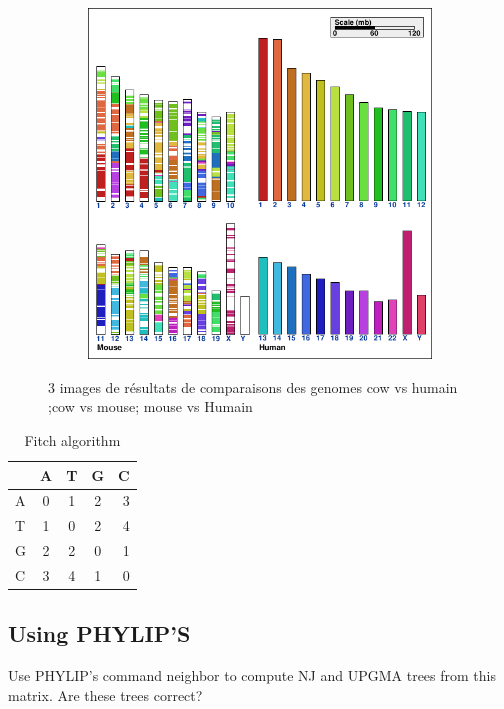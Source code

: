\begin{figure}[!h]
\begin{subfigure}[b]{0.13\textwidth}
\includegraphics[width=\textwidth]{imag/graph3_mouse_Himan1}
\end{subfigure}
\caption{3 images de r\'{e}sultats de comparaisons des genomes cow vs humain ;cow vs mouse; mouse vs Humain}
\end{figure}

\begin{table}[!h]
  \centering
\begin{tabular}{|l|c|c|c|r|}
\hline
    & A & T & G & C \\
  \hline
  A  & 0 & 1 & 2 & 3 \\
	\hline
	T  & 1 & 0 & 2 & 4 \\
	\hline
  G  & 2 & 2 & 0 & 1 \\
  \hline
  C  & 3 & 4 & 1 & 0 \\
  \hline
\end{tabular}
	\caption{Fitch algorithm}
	\label{tab:commands}
\end{table}

\subsection{Using PHYLIP'S}
Use PHYLIP's command neighbor to compute NJ and UPGMA trees from this matrix.  Are these trees correct?